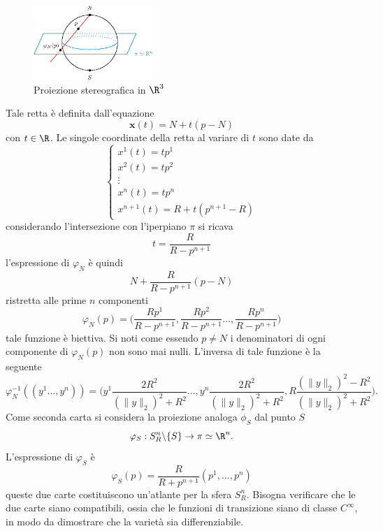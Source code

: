 \documentclass[10pt, letterpaper]{report}
\begin{document}
\begin{figure}[h!]
    \center
    \includegraphics[width=0.4\textwidth ]{images/proiezione_stereografica.eps}
    \caption{Proiezione stereografica in $\R^3$}
    \label{img:proiezione_stereografica}
\end{figure}


Tale retta è definita dall'equazione\begin{equation}
    \mathbf x(t)=N+t(p-N)
\end{equation}
con $t\in\R$. Le singole coordinate della retta al variare di $t$ sono date da \begin{equation}
    \begin{cases}
        x^1(t)=tp^1\\ 
        x^2(t)=tp^2\\ 
        \vdots \\ 
        x^n(t)=tp^n\\ 
        x^{n+1}(t)=R+t(p^{n+1}-R)
    \end{cases}
\end{equation}
considerando l'intersezione con l'iperpiano $\pi$ si ricava \begin{equation}
    t=\frac{R}{R-p^{n+1}}
\end{equation}
l'espressione di $\varphi_N$ è quindi 
\begin{equation}
   N+\frac{R}{R-p^{n+1}}(p-N)
\end{equation}
ristretta alle prime $n$ componenti\begin{equation}
     \varphi_N(p)=\big(
     \frac{Rp^1}{R-p^{n+1}},\frac{Rp^2}{R-p^{n+1}}\dots,  \frac{Rp^n}{R-p^{n+1}}    
     \big)
\end{equation}
tale funzione è biettiva. Si noti come essendo $p\ne N$ i denominatori di ogni componente di $\varphi_N(p)$ non sono mai nulli. L'inversa di tale funzione è la seguente\begin{equation}
\varphi_N^{-1}((y^1\dots,y^n))=\big(
y^1\frac{2R^2}{(\|y\|_2)^2+R^2}\dots,  
y^n\frac{2R^2}{(\|y\|_2)^2+R^2}, R\frac{(\|y\|_2)^2-R^2}{(\|y\|_2)^2+R^2}
\big).
\end{equation} Come seconda carta si considera la proiezione analoga $\phi_S$ dal punto $S$\begin{equation}
    \varphi_S:S_R^{n}\backslash\{S\}\rightarrow\pi\simeq\R^n.
\end{equation}
L'espressione di $\varphi_S$ è  
\begin{equation}
     \varphi_S(p)=\frac{R}{R+p^{n+1}}(p^1,\dots,p^n)
\end{equation}
queste due carte costituiscono un'atlante per la sfera $S_R^{n}$. Bisogna verificare che le due carte siano compatibili, ossia che le funzioni di transizione siano di classe $C^\infty$, in modo da dimostrare che la varietà sia differenziabile.
\end{document}
